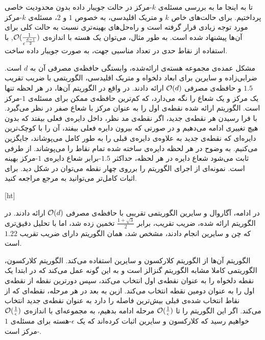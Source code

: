 تا به اینجا ما به بررسی مسئله‌ی $k$-مرکز‌ در حالت جویبار داده بدون محدودیت خاصی پرداختیم. برای حالت‌های خاص $k$ و متریک اقلیدسی، به خصوص $1$ و $2$، مسئله‌ی $k$-مرکز مورد توجه زیادی قرار گرفته است و راه‌حل‌های بهینه‌تری نسبت به حالت کلی برای آن‌ها پیشنهاد شده است. به طور مثال، می‌توان یک هسته با اندازه‌ی‌ $\mathcal{O}(\frac{1}{\epsilon^{\frac{d-1}{2}}})$, با استفاده از نقاط حدی در تعداد مناسبی جهت، به صورت جویبار داده ساخت. 

مشکل عمده‌ی مجموعه هسته‌ی ارائه‌شده، وابستگی حافظه‌ی مصرفی آن به $d$ است. ضرابی‌زاده و سایرین برای ابعاد دلخواه و متریک اقلیدسی، الگوریتمی با ضریب تقریب $1.5$ و حافظه‌ی مصرفی $\mathcal{O}(d)$ ارائه دادند. در واقع در الگوریتم آن‌ها، در هر لحظه تنها یک مرکز و یک شعاع را نگه می‌دارد، که کم‌ترین حافظه‌ی ممکن برای مسئله‌ی $1$-مرکز است. الگوریتم ارائه شده نقطه‌ی اول را به عنوان مرکز با شعاع صفر در نظر می‌گیرد. با فرا رسیدن هر نقطه‌ی جدید، اگر نقطه‌ی مد نظر، داخل دایره‌ی فعلی بیفتد که بدون هیچ‌ تغییری ادامه می‌دهیم و در صورتی که بیرون دایره فعلی بیفتد، آن را با کوچک‌ترین دایره‌ای که نقطه‌ی جدید به علاوه‌ی دایره‌ی قبلی را به طور کامل می‌پوشاند، جایگزین می‌کنیم. به وضوح در هر لحظه دایره‌ی ساخته شده تمام نقاط را می‌پوشاند. از طرفی ثابت می‌شود شعاع دایره‌ در هر لحظه، حداکثر $1.5$-برابر شعاع دایره‌ی $1$-مرکز بهینه است. نمونه‌ای از‌ اجرای الگوریتم را برروی چهار نقطه می‌توان در شکل  دید. برای اثبات کامل‌تر می‌توانید به مرجع  مراجعه کنید. 

[ht]


در ادامه، آگاروال و سایرین الگوریتمی تقریبی با حافظه‌ی مصرفی $\mathcal{O}(d)$ ارائه دادند. در الگوریتم ارائه شده، ضریب تقریب، برابر $\frac{1 + \sqrt{3}}{2}$  تخمین زده شد، اما با تحلیل دقیق‌تری که چن و سایرین  انجام دادند، مشخص شد، همان الگوریتم دارای ضریب تقریب $1.22$ است.

الگوریتم آن‌ها از الگوریتم کلارکسون و سایرین استفاده می‌کند. الگوریتم کلارکسون، الگوریتمی کاملا مشابه الگوریتم گنزالز است و به این گونه عمل می‌کند که در ابتدا یک نقطه دلخواه را به عنوان نقطه‌ی اول انتخاب می‌کند، سپس دورترین نقطه از‌ نقطه‌ی اول را به عنوان دومین نقطه انتخاب می‌کند. ازین به بعد در هر مرحله، نقطه‌ای که از نقاط انتخاب شده‌ی قبلی بیش‌ترین فاصله را دارد به عنوان نقطه‌ی جدید انتخاب می‌کند. اگر این الگوریتم را تا $\mathcal{O}(\frac{1}{\epsilon})$ مرحله ادامه بدهیم، به مجموعه‌ای با اندازه‌ی $\mathcal{O}(\frac{1}{\epsilon})$ خواهیم رسید که  کلارکسون و سایرین اثبات کرده‌اند که یک $\epsilon$-هسته برای مسئله‌ی $1$-مرکز‌ است.

